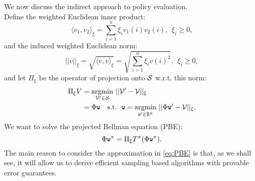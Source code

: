 We now discuss the indirect approach to policy evaluation.
\\
Define the weighted Euclidean inner product:
$$\langle v_1,v_2\rangle_\xi = {\sum_{i=1}^n \xi_i v_1(i)v_2(i)}, \ \ \xi_i\ge0,$$
and the induced weighted Euclidean norm:
$$||v||_\xi = \sqrt{\langle v,v\rangle_\xi} = \sqrt{\sum_{i=1}^n \xi_i v(i)^2}, \ \ \xi_i\ge0,$$
and let $\Pi_\xi$ be the operator of projection onto $\mathcal{S}$ w.r.t. this norm:
\begin{align*}
\Pi_\xi V &=\underset{\Value' \in \States}{\operatorname{argmin}} \ ||\Value'-\Value||_\xi \\
&= \FtrMtx \weights \ \ \ \mathrm{s.t.} \ \ \weights = \underset{\weights' \in \mathbb{R}^k}{\operatorname{argmin}} \ ||\FtrMtx \weights' - \Value||_\xi.
\end{align*}
We want to solve the projected Bellman equation (PBE):
\begin{equation}\label{eq:PBE}
\Phi \texttt{w}^{\pi}  = \Pi_\xi T^\pi(\Phi \texttt{w}^{\pi}).
\end{equation}
The main reason to consider the approximation in \eqref{eq:PBE} is that, as we shall see, it will allow us to derive efficient sampling based algorithms with provable error guarantees.

